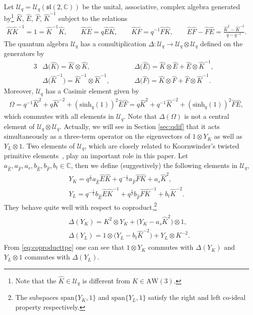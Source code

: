 \documentclass[10pt,a4paper]{amsart}
\numberwithin{equation}{section}
\newcommand{\CC}{\mathbb{C}}
\newcommand{\aw}{\mathrm{AW}\!\left(3\right)}
\newcommand{\half}{\frac{1}{2}}
\newcommand{\shq}{\mathrm{sinh}_q}
\newcommand{\Uq}{\mathcal{U}_q}
\newcommand{\uql}[1][q]{\mathcal{U}_{#1}(\mathfrak{sl}(2,\CC))}
\newcommand{\vspan}[1]{\text{span}\{#1\}}
\begin{document}
Let $\Uq=\uql$ be the unital, associative, complex algebra generated by\footnote{Note that the $\hat{K}\in\Uq$ is different from $K\in\aw$.} $\hat{K}$, $\hat{E}$, $\hat{F}$, $\hat{K}^{-1}$ subject to the relations
\begin{gather*}%
	\hat{K}\hat{K}^{-1}=1=\hat{K}^{-1}\hat{K},\qquad \hat{K}\hat{E}=q\hat{E}\hat{K},\qquad \hat{K}\hat{F}=q^{-1}\hat{F}\hat{K},\qquad \hat{E}\hat{F}-\hat{F}\hat{E}=\frac{\hat{K}^2-\hat{K}^{-2}}{q-q^{-1}}.
\end{gather*}
The quantum algebra $\Uq$ has a comultiplication $\Delta\colon \Uq \to \Uq \otimes \Uq$ defined on the generators by
\begin{alignat*}{3}
& \Delta\big(\hat{K}\big)=\hat{K}\otimes \hat{K},\qquad && \Delta\big(\hat{E}\big)=\hat{K}\otimes \hat{E} + \hat{E}\otimes \hat{K}^{-1},&\\
& \Delta\big(\hat{K}^{-1}\big)=\hat{K}^{-1}\otimes \hat{K}^{-1},\qquad && \Delta\big(\hat{F}\big)=\hat{K}\otimes \hat{F} + \hat{F} \otimes \hat{K}^{-1}.&
\end{alignat*}
Moreover, $\Uq$ has a Casimir element given by
\begin{gather*}
	\Omega=q^{-1}\hat{K}^2+q\hat{K}^{-2}+(\shq(1))^2\hat{E}\hat{F} = q\hat{K}^2+q^{-1}\hat{K}^{-2}+(\shq(1))^2\hat{F}\hat{E},%
\end{gather*}
which commutes with all elements in $\Uq$. Note that $\Delta(\Omega)$ is not a central element of ${\Uq\otimes\Uq}$. Actually, we will see in Section \ref{sec:qdif} that it acts simultaneously as a three-term operator on the eigenvectors of $1\otimes Y_K$ as well as $Y_L\otimes 1$.
Two elements of $\Uq$, which are closely related to Koornwinder's twisted primitive ele\-ments~\cite{Koornwinder1993}, play an important role in this paper. Let $a_{\hat{E}},a_{\hat{F}},a_s,b_{\hat{E}},b_{\hat{F}},b_t\in\CC$, then we define (suggestively) the following elements in $\Uq$,
\begin{gather*}
	Y_{K} =q^\half a_{\hat{E}} \hat{E}\hat{K}+ q^{-\half}a_{\hat{F}} \hat{F}\hat{K} + a_s \hat{K}^2,\\ %
	Y_{L} =q^{-\half} b_{\hat{E}} \hat{E}\hat{K}^{-1}+ q^{\half} b_{\hat{F}} \hat{F}\hat{K}^{-1} + b_t \hat{K}^{-2}.%
\end{gather*}	 	
They behave quite well with respect to coproduct,\footnote{The subspaces $\vspan{Y_K,1}$ and $\vspan{Y_L,1}$ satisfy the right and left co-ideal property respectively.}
\begin{align}
	\begin{split}&\Delta(Y_K)=K^2 \otimes Y_K + \big(Y_K -a_s \hat{K}^2\big)\otimes 1,\\
		&\Delta(Y_L)=1\otimes \big(Y_L-b_t \hat{K}^{-2}\big) + Y_L\otimes K^{-2}.\end{split}\label{eq:coproducttpe}
\end{align}
From \eqref{eq:coproducttpe} one can see that $1\otimes Y_K$ commutes with $\Delta(Y_K)$ and $Y_L\otimes 1$ commutes with $\Delta(Y_L)$.
\end{document}
